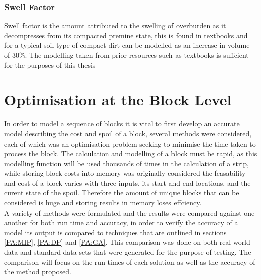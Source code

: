 \subsubsection{Swell Factor}
Swell factor is the amount attributed to the swelling of overburden as it decompresses from its compacted premine state, this is found in textbooks and for a typical soil type of compact dirt can be modelled as an increase in volume of 30\%. The modelling taken from prior resources such as textbooks is suffcient for the purposes of this thesis 

	


\section{Optimisation at the Block Level}
In order to model a sequence of blocks it is vital to first develop an accurate model describing the cost and spoil of a block, several methods were considered, each of which was an optimisation problem seeking to minimise the time taken to process the block. The calculation and modelling of a block must be rapid, as this modelling function will be used thousands of times in the calculation of a strip, while storing block costs into memory was originally considered the feasability and cost of a block varies with three inputs, its start and end locations, and the curent state of the spoil. Therefore the amount of unique blocks that can be considered is huge and storing results in memory loses effciency. \\A variety of methods were formulated and the results were compared against one another for both run time and accuracy, in order to verify the accuracy of a model its output is compared to techniques that are outlined in sections \ref{PA:MIP}, \ref{PA:DP} and \ref{PA:GA}. This comparison was done on both real world data and standard data sets that were generated for the purpose of testing. The comparison will focus on the run times of each solution as well as the accuracy of the method proposed. 


